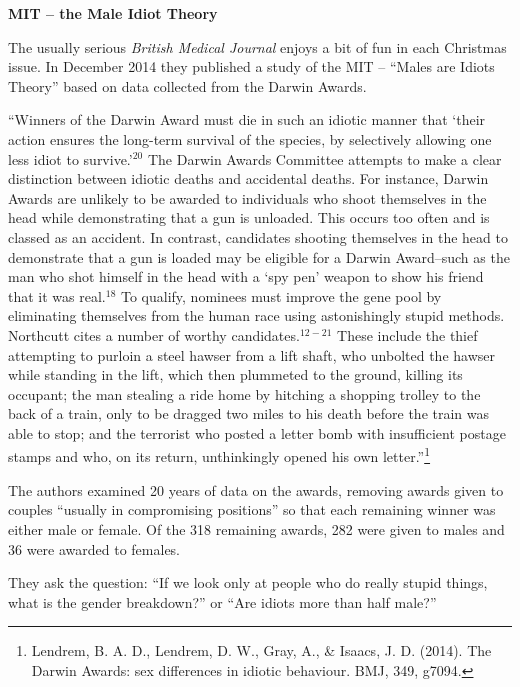 \def\theTopic{Inference on Proportions }
\def\dayNum{8}

\begin{center}
{\bf {\large MIT -- the Male Idiot Theory}}
\end{center}

The usually  serious {\em British Medical Journal} enjoys a bit
of fun in each Christmas issue.  In December 2014 they
published a study of the MIT -- ``Males are Idiots Theory'' based on
data collected from the Darwin Awards.

``Winners of the Darwin Award must die in such an idiotic
manner that `their action ensures the long-term survival of the
species, by selectively allowing one less idiot to survive.'$^{20}$ The
Darwin Awards Committee attempts to make a clear distinction
between idiotic deaths and accidental deaths. For instance,
Darwin Awards are unlikely to be awarded to individuals who
shoot themselves in the head while demonstrating that a gun is
unloaded. This occurs too often and is classed as an accident.
In contrast, candidates shooting themselves in the head to
demonstrate that a gun is loaded may be eligible for a Darwin
Award--such as the man who shot himself in the head with a
`spy pen' weapon to show his friend that it was real.$^{18}$
To qualify, nominees must improve the gene pool by eliminating
themselves from the human race using astonishingly stupid
methods. Northcutt cites a number of worthy candidates.$^{12-21}$
These include the thief attempting to purloin a steel hawser from
a lift shaft, who unbolted the hawser while standing in the lift,
which then plummeted to the ground, killing its occupant; the
man stealing a ride home by hitching a shopping trolley to the
back of a train, only to be dragged two miles to his death before
the train was able to stop; and the terrorist who posted a letter
bomb with insufficient postage stamps and who, on its return,
unthinkingly opened his own letter.''\footnote{Lendrem, B. A. D.,
  Lendrem, D. W., Gray, A., \& Isaacs, J. D. (2014). The Darwin
  Awards: sex differences in idiotic behaviour. BMJ, 349, g7094.} 

The authors examined 20 years of data on the awards, removing awards
given to couples ``usually in compromising positions'' so that each
remaining winner was either male or female. Of the 318 remaining
awards, 282 were given to males and 36 were awarded to females.

They ask the question: ``If we look only at  people who do really
stupid things, what is the gender breakdown?''  or ``Are idiots more
than half male?''

